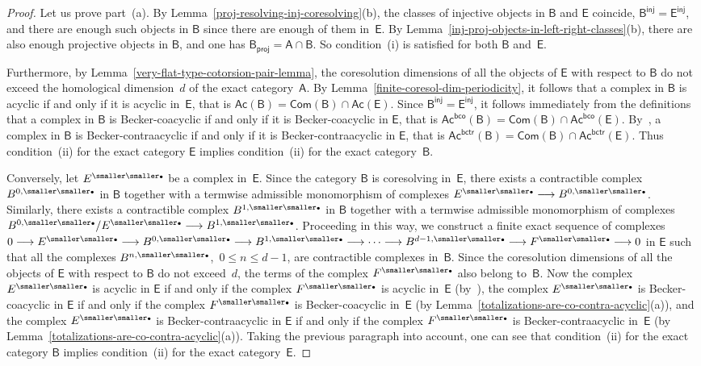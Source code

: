 \documentclass[12pt,a4paper]{amsart}
\newcommand{\+}{\nobreakdash-}
\renewcommand{\:}{\colon}
\newcommand{\rarrow}{\longrightarrow}
\newcommand{\bu}{{\text{\smaller\smaller$\scriptstyle\bullet$}}}
\newcommand{\sA}{\mathsf A}
\newcommand{\sB}{\mathsf B}
\newcommand{\sE}{\mathsf E}
\newcommand{\Com}{\mathsf{Com}}
\newcommand{\Ac}{\mathsf{Ac}}
\newcommand{\proj}{\mathsf{proj}}
\newcommand{\inj}{\mathsf{inj}}
\newcommand{\bco}{\mathsf{bco}}
\newcommand{\bctr}{\mathsf{bctr}}
\theoremstyle{plain}
\theoremstyle{definition}
\begin{document}
\begin{proof}
 Let us prove part~(a).
 By Lemma~\ref{proj-resolving-inj-coresolving}(b), the classes of
injective objects in $\sB$ and $\sE$ coincide, $\sB^\inj=\sE^\inj$, and
there are enough such objects in $\sB$ since there are enough of them
in~$\sE$.
 By Lemma~\ref{inj-proj-objects-in-left-right-classes}(b), there are
also enough projective objects in $\sB$, and one has
$\sB_\proj=\sA\cap\sB$.
 So condition~(i) is satisfied for both $\sB$ and~$\sE$.

 Furthermore, by Lemma~\ref{very-flat-type-cotorsion-pair-lemma},
the coresolution dimensions of all the objects of $\sE$ with
respect to $\sB$ do not exceed the homological dimension~$d$ of
the exact category~$\sA$.
 By Lemma~\ref{finite-coresol-dim-periodicity}, it follows that
a complex in $\sB$ is acyclic if and only if it is acyclic in~$\sE$,
that is $\Ac(\sB)=\Com(\sB)\cap\Ac(\sE)$.
 Since $\sB^\inj=\sE^\inj$, it follows immediately from the definitions
that a complex in $\sB$ is Becker-coacyclic if and only if it is
Becker-coacyclic in $\sE$, that is $\Ac^\bco(\sB)=\Com(\sB)\cap
\Ac^\bco(\sE)$.
 By~\cite[Proposition~B.7.10]{Pcosh}, a complex in $\sB$ is
Becker-contraacyclic if and only if it is Becker-contraacyclic
in $\sE$, that is $\Ac^\bctr(\sB)=\Com(\sB)\cap\Ac^\bctr(\sE)$.
 Thus condition~(ii) for the exact category $\sE$ implies condition~(ii)
for the exact category~$\sB$.

 Conversely, let $E^\bu$ be a complex in~$\sE$.
 Since the category $\sB$ is coresolving in~$\sE$, there exists
a contractible complex $B^{0,\bu}$ in $\sB$ together with a termwise
admissible monomorphism of complexes $E^\bu\rarrow B^{0,\bu}$.
 Similarly, there exists a contractible complex $B^{1,\bu}$ in $\sB$
together with a termwise admissible monomorphism of complexes
$B^{0,\bu}/E^\bu\rarrow B^{1,\bu}$.
 Proceeding in this way, we construct a finite exact sequence of
complexes $0\rarrow E^\bu\rarrow B^{0,\bu}\rarrow B^{1,\bu}\rarrow
\dotsb\rarrow B^{d-1,\bu}\rarrow F^\bu\rarrow0$ in $\sE$ such that
all the complexes $B^{n,\bu}$, \,$0\le n\le d-1$, are contractible
complexes in~$\sB$.
 Since the coresolution dimensions of all the objects of $\sE$ with
respect to $\sB$ do not exceed~$d$, the terms of the complex $F^\bu$
also belong to~$\sB$.
 Now the complex $E^\bu$ is acyclic in $\sE$ if and only if the complex
$F^\bu$ is acyclic in~$\sE$ (by~\cite[Corollary~3.6]{Bueh}),
the complex $E^\bu$ is Becker-coacyclic in $\sE$ if and only if
the complex $F^\bu$ is Becker-coacyclic in~$\sE$
(by Lemma~\ref{totalizations-are-co-contra-acyclic}(a)), and
the complex $E^\bu$ is Becker-contraacyclic in $\sE$ if and only if
the complex $F^\bu$ is Becker-contraacyclic in~$\sE$
(by Lemma~\ref{totalizations-are-co-contra-acyclic}(a)).
 Taking the previous paragraph into account, one can see that
condition~(ii) for the exact category $\sB$ implies condition~(ii)
for the exact category~$\sE$.


\end{proof}
\end{document}

